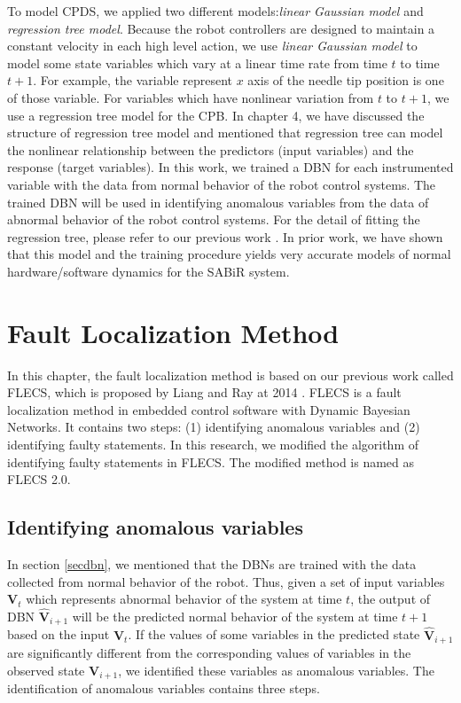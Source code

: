 To model CPDS, we applied two different models:{\it linear Gaussian model} and {\it regression tree model}. Because the robot controllers are designed to maintain a constant velocity in each high level action, we use {\it linear Gaussian model} to model some state variables which vary at a linear time rate from time $t$ to time $t+1$. For example, the variable represent $x$ axis of the needle tip position is one of those variable. For variables which have nonlinear variation from $t$ to $t+1$, we use a regression tree model for the CPB. In chapter 4, we have discussed the structure of regression tree model and mentioned that regression tree can model the nonlinear relationship between the predictors (input variables) and the response (target variables). In this work, we trained a DBN for each instrumented variable with the data from normal behavior of the robot control systems. The trained DBN will be used in identifying anomalous variables from the data of abnormal behavior of the robot control systems. For the detail of fitting the regression tree, please refer to our previous work \cite{}. In prior work, we have shown that this model and the training procedure yields very accurate models of normal hardware/software dynamics for the SABiR system. 

\section{Fault Localization Method}\label{dbnflalg}
In this chapter, the fault localization method is based on our previous work called FLECS, which is proposed by Liang and Ray at 2014 \cite{sescps}. FLECS is a fault localization method in embedded control software with Dynamic Bayesian Networks. It contains two steps: (1) identifying anomalous variables and (2) identifying faulty statements. In this research, we modified the algorithm of identifying faulty statements in FLECS. The modified method is named as FLECS 2.0. 

\subsection{Identifying anomalous variables}
In section \ref{secdbn}, we mentioned that the DBNs are trained with the data collected from normal behavior of the robot. Thus, given a set of input variables ${\pmb{V}_t}$ which represents abnormal behavior of the system at time $t$, the output of DBN $ {\pmb{{\hat V}}_{i + 1}} $ will be the predicted normal behavior of the system at time $t+1$ based on the input ${\pmb{V}_t} $. If the values of some variables in the predicted state $ {\pmb{{\hat V}}_{i + 1}} $ are significantly different from the corresponding values of variables in the observed state  $ {\pmb{V}_{i + 1}} $, we identified these variables as anomalous variables. The identification of anomalous variables contains three steps.


